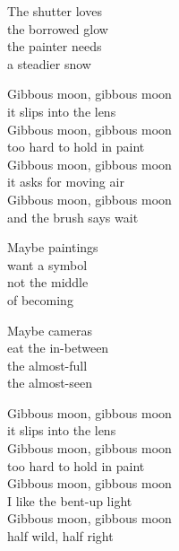 \begin{lyrics}
The shutter loves\\
the borrowed glow\\
the painter needs\\
a steadier snow

Gibbous moon, gibbous moon\\
it slips into the lens\\
Gibbous moon, gibbous moon\\
too hard to hold in paint\\
Gibbous moon, gibbous moon\\
it asks for moving air\\
Gibbous moon, gibbous moon\\
and the brush says wait

Maybe paintings\\
want a symbol\\
not the middle\\
of becoming

Maybe cameras\\
eat the in-between\\
the almost-full\\
the almost-seen

Gibbous moon, gibbous moon\\
it slips into the lens\\
Gibbous moon, gibbous moon\\
too hard to hold in paint\\
Gibbous moon, gibbous moon\\
I like the bent-up light\\
Gibbous moon, gibbous moon\\
half wild, half right
\end{lyrics}

